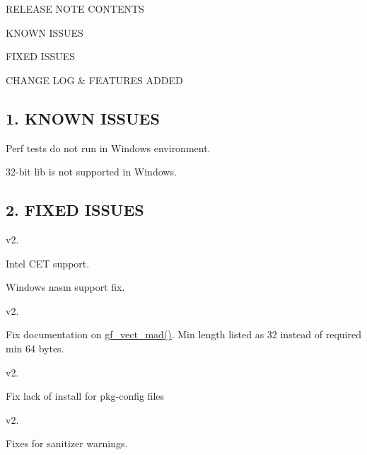 R\-E\-L\-E\-A\-S\-E N\-O\-T\-E C\-O\-N\-T\-E\-N\-T\-S
\begin{DoxyEnumerate}
\item K\-N\-O\-W\-N I\-S\-S\-U\-E\-S
\item F\-I\-X\-E\-D I\-S\-S\-U\-E\-S
\item C\-H\-A\-N\-G\-E L\-O\-G \& F\-E\-A\-T\-U\-R\-E\-S A\-D\-D\-E\-D
\end{DoxyEnumerate}

\subsection*{1. K\-N\-O\-W\-N I\-S\-S\-U\-E\-S }


\begin{DoxyItemize}
\item Perf tests do not run in Windows environment.
\item 32-\/bit lib is not supported in Windows.
\end{DoxyItemize}

\subsection*{2. F\-I\-X\-E\-D I\-S\-S\-U\-E\-S }

v2.


\begin{DoxyItemize}
\item Intel C\-E\-T support.
\item Windows nasm support fix.
\end{DoxyItemize}

v2.


\begin{DoxyItemize}
\item Fix documentation on \hyperlink{erasure__code_8h_ae9f15336f98bcbdbc529a4ff6b0eda5e}{gf\-\_\-vect\-\_\-mad()}. Min length listed as 32 instead of required min 64 bytes.
\end{DoxyItemize}

v2.


\begin{DoxyItemize}
\item Fix lack of install for pkg-\/config files
\end{DoxyItemize}

v2.


\begin{DoxyItemize}
\item Fixes for sanitizer warnings.
\end{DoxyItemize}

